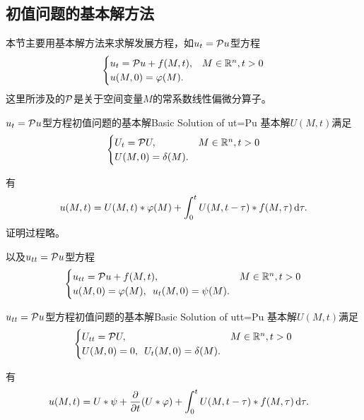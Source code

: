 \subsection{初值问题的基本解方法}
本节主要用基本解方法来求解发展方程，如$u_t=\mathcal P u$型方程
\begin{align}
	\begin{cases}
		u_t=\mathcal P u+f(M,t),&M\in\mathbb R^n,t>0\\
		u(M,0)=\varphi(M).
	\end{cases}
\end{align}
这里所涉及的$\mathcal P$是关于空间变量$M$的常系数线性偏微分算子。

\begin{definition}{$u_t=\mathcal P u$型方程初值问题的基本解}{Basic Solution of ut=Pu}
	基本解$U(M,t)$满足
	\begin{align}
		\begin{cases}
			U_t=\mathcal P U,&M\in\mathbb R^n,t>0\\
			U(M,0)=\mathop{}\!\delta(M).
		\end{cases}
	\end{align}
\end{definition}
有
\begin{align}
	u(M,t)=U(M,t)\ast\varphi(M)+\int_0^tU(M,t-\tau)\ast f(M,\tau)\mathop{}\!\mathrm{d}\tau.
\end{align}
证明过程略。

以及$u_{tt}=\mathcal P u$型方程
\begin{align}
	\begin{cases}
		u_{tt}=\mathcal P u+f(M,t),&M\in\mathbb R^n,t>0\\
		u(M,0)=\varphi(M),\enspace u_t(M,0)=\psi(M).
	\end{cases}
\end{align}
\begin{definition}{$u_{tt}=\mathcal P u$型方程初值问题的基本解}{Basic Solution of utt=Pu}
	基本解$U(M,t)$满足
	\begin{align}
		\begin{cases}
			U_{tt}=\mathcal P U,&M\in\mathbb R^n,t>0\\
			U(M,0)=0,\enspace U_t(M,0)=\mathop{}\!\delta(M).
		\end{cases}
	\end{align}
\end{definition}
有
\begin{align}
	\begin{aligned}
		u(M,t)=&\;U\ast\psi+\frac{\partial^{\;\!\!}}{\partial t^{\;\!\!}}(U\ast\varphi)+\int_0^tU(M,t-\tau)\ast f(M,\tau)\mathop{}\!\mathrm{d}\tau.
	\end{aligned}
\end{align}

